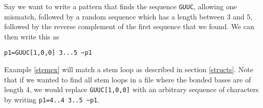 \documentclass[11pt,twoside,a4paper]{article}
\begin{document}
\begin{myex}\label{stemex}
Say we want to write a pattern that finds the sequence {\tt GUUC}, allowing 
one mismatch, followed by a random sequence which has a length between 3 and 5, 
followed by the reverse complement of the first sequence that we found. We can 
then write this as \begin{center}
{\tt p1=GUUC[1,0,0] 3...5 \textasciitilde p1}
\end{center}
\end{myex}
Example \ref{stemex} will match a stem loop as described in section 
\ref{structs}. Note that if we wanted to find all stem loops in a file where 
the bonded bases are of length 
4, we would replace {\tt GUUC[1,0,0]} with an arbitrary sequence of characters 
by writing {\tt p1=4..4 3..5 \textasciitilde p1}. 
\end{document}
